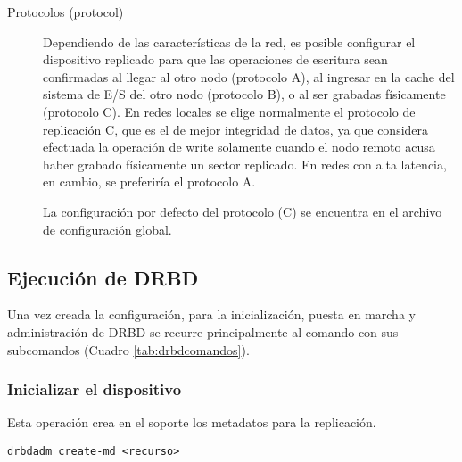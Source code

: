 \begin{description}
\item [Protocolos (protocol)]
Dependiendo de las características de la red, es posible configurar el dispositivo replicado para que las operaciones de escritura sean confirmadas al llegar al otro nodo (protocolo A), al ingresar en la cache del sistema de E/S del otro nodo (protocolo B), o al ser grabadas físicamente (protocolo C). En redes locales se elige normalmente el protocolo de replicación C, que es el de mejor integridad de datos, ya que considera efectuada la operación de write solamente cuando el nodo remoto acusa haber grabado físicamente un sector replicado. En redes con alta latencia, en cambio, se preferiría el protocolo A.

La configuración por defecto del protocolo (C) se encuentra en el archivo de configuración global.


\end{description}


\subsection{Ejecución de DRBD}
Una vez creada la configuración, para la inicialización, puesta en marcha y administración de DRBD se recurre principalmente al comando  con sus subcomandos (Cuadro \ref{tab:drbdcomandos}). 

\subsubsection{Inicializar el dispositivo}
Esta operación crea en el soporte los metadatos para la replicación. 
\begin{lstlisting}
drbdadm create-md <recurso>
\end{lstlisting}

